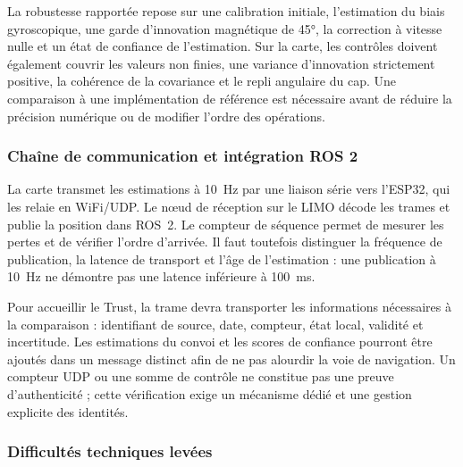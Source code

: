 
La robustesse rapportée repose sur une calibration initiale, l'estimation du biais gyroscopique, une garde d'innovation magnétique de 45°, la correction à vitesse nulle et un état de confiance de l'estimation. Sur la carte, les contrôles doivent également couvrir les valeurs non finies, une variance d'innovation strictement positive, la cohérence de la covariance et le repli angulaire du cap. Une comparaison à une implémentation de référence est nécessaire avant de réduire la précision numérique ou de modifier l'ordre des opérations.
\FloatBarrier

\subsubsection{Chaîne de communication et intégration ROS 2}

La carte transmet les estimations à 10~Hz par une liaison série vers l'ESP32, qui les relaie en WiFi/UDP. Le nœud de réception sur le LIMO décode les trames et publie la position dans ROS~2. Le compteur de séquence permet de mesurer les pertes et de vérifier l'ordre d'arrivée. Il faut toutefois distinguer la fréquence de publication, la latence de transport et l'âge de l'estimation : une publication à 10~Hz ne démontre pas une latence inférieure à 100~ms.


Pour accueillir le Trust, la trame devra transporter les informations nécessaires à la comparaison : identifiant de source, date, compteur, état local, validité et incertitude. Les estimations du convoi et les scores de confiance pourront être ajoutés dans un message distinct afin de ne pas alourdir la voie de navigation. Un compteur UDP ou une somme de contrôle ne constitue pas une preuve d'authenticité ; cette vérification exige un mécanisme dédié et une gestion explicite des identités.
\FloatBarrier

\subsubsection{Difficultés techniques levées}

